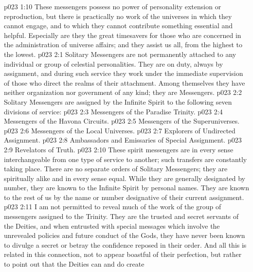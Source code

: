 \vs p023 1:10 \pc These messengers possess no power of personality extension or reproduction, but there is practically no work of the universes in which they cannot engage, and to which they cannot contribute something essential and helpful. Especially are they the great timesavers for those who are concerned in the administration of universe affairs; and they assist us all, from the highest to the lowest.
\vs p023 2:1 Solitary Messengers are not permanently attached to any individual or group of celestial personalities. They are on duty, always by assignment, and during such service they work under the immediate supervision of those who direct the realms of their attachment. Among themselves they have neither organization nor government of any kind; they are  Messengers.
\vs p023 2:2 \pc Solitary Messengers are assigned by the Infinite Spirit to the following seven divisions of service:
\vs p023 2:3 \bibnobreakspace Messengers of the Paradise Trinity.
\vs p023 2:4 \bibnobreakspace Messengers of the Havona Circuits.
\vs p023 2:5 \bibnobreakspace Messengers of the Superuniverses.
\vs p023 2:6 \bibnobreakspace Messengers of the Local Universes.
\vs p023 2:7 \bibnobreakspace Explorers of Undirected Assignment.
\vs p023 2:8 \bibnobreakspace Ambassadors and Emissaries of Special Assignment.
\vs p023 2:9 \bibnobreakspace Revelators of Truth.
\vs p023 2:10 \pc These spirit messengers are in every sense interchangeable from one type of service to another; such transfers are constantly taking place. There are no separate orders of Solitary Messengers; they are spiritually alike and in every sense equal. While they are generally designated by number, they are known to the Infinite Spirit by personal names. They are known to the rest of us by the name or number designative of their current assignment.
\vs p023 2:11 \bibnobreakspace {} I am not permitted to reveal much of the work of the group of messengers assigned to the Trinity. They are the trusted and secret servants of the Deities, and when entrusted with special messages which involve the unrevealed policies and future conduct of the Gods, they have never been known to divulge a secret or betray the confidence reposed in their order. And all this is related in this connection, not to appear boastful of their perfection, but rather to point out that the Deities can and do create 
